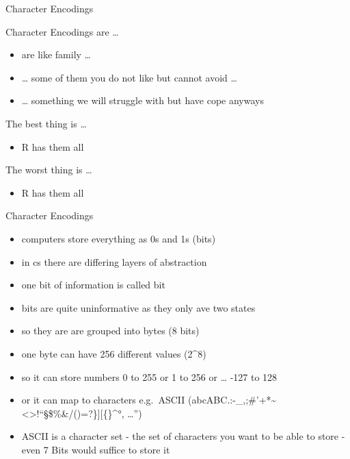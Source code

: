 \documentclass[ignorenonframetext,]{beamer}
\providecommand{\tightlist}{%
  \setlength{\itemsep}{0pt}\setlength{\parskip}{0pt}}
\begin{document}
\begin{frame}{Character Encodings}

Character Encodings are \ldots{}

\begin{itemize}
\tightlist
\item
  are like family \ldots{}
\item
  \ldots{} some of them you do not like but cannot avoid \ldots{}
\item
  \ldots{} something we will struggle with but have cope anyways
\end{itemize}

The best thing is \ldots{}

\begin{itemize}
\tightlist
\item
  R has them all
\end{itemize}

The worst thing is \ldots{}

\begin{itemize}
\tightlist
\item
  R has them all
\end{itemize}

\end{frame}

\begin{frame}{Character Encodings}

\begin{itemize}
\tightlist
\item
  computers store everything as 0s and 1s (bits)
\item
  in cs there are differing layers of abstraction
\item
  one bit of information is called bit
\item
  bits are quite uninformative as they only ave two states
\item
  so they are are grouped into bytes (8 bits)
\item
  one byte can have 256 different values (2\^{}8)
\item
  so it can store numbers 0 to 255 or 1 to 256 or \ldots{} -127 to 128
\item
  or it can map to characters e.g.~ASCII
  (abcABC.:-\_,;\#'+*\textasciitilde{}\textbar{}\textless{}\textgreater{}!``§\$\%\&/()=?\}{]}{[}\{\}\^{}°,
  \ldots{}'')
\item
  ASCII is a character set - the set of characters you want to be able
  to store - even 7 Bits would suffice to store it
\end{itemize}

\end{frame}
\end{document}
